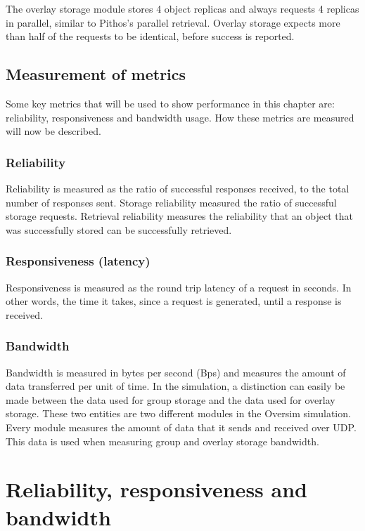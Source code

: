 The overlay storage module stores 4 object replicas and always requests 4 replicas in parallel, similar to Pithos's parallel retrieval. Overlay storage expects more than half of the requests to be identical, before success is reported.

\subsection{Measurement of metrics}

Some key metrics that will be used to show performance in this chapter are: reliability, responsiveness and bandwidth usage. How these metrics are measured will now be described.

\subsubsection{Reliability}
Reliability is measured as the ratio of successful responses received, to the total number of responses sent. Storage reliability measured the ratio of successful storage requests. Retrieval reliability measures the reliability that an object that was successfully stored can be successfully retrieved.

\subsubsection{Responsiveness (latency)}

Responsiveness is measured as the round trip latency of a request in seconds.  In other words, the time it takes, since a request is generated, until a response is received.

\subsubsection{Bandwidth}

Bandwidth is measured in bytes per second (Bps) and measures the amount of data transferred per unit of time. In the simulation, a distinction can easily be made between the data used for group storage and the data used for overlay storage. These two entities are two different modules in the Oversim simulation. Every module measures the amount of data that it sends and received over UDP. This data is used when measuring group and overlay storage bandwidth.

\section{Reliability, responsiveness and bandwidth}

